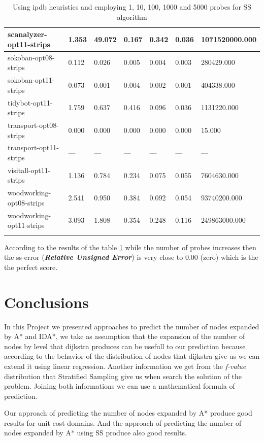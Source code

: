 \documentclass[11pt,a4paper,oneside]{report}
\begin{document}
\begin{longtable}{@{\extracolsep{\fill}} lllllll @{}}
scanalyzer-opt11-strips  & 1.353    & 49.072   & 0.167    & 0.342    & 0.036    & 1071520000.000 \\ \hline
sokoban-opt08-strips     & 0.112    & 0.026    & 0.005    & 0.004    & 0.003    & 280429.000     \\ \hline
sokoban-opt11-strips     & 0.073    & 0.001    & 0.004    & 0.002    & 0.001    & 404338.000     \\ \hline
tidybot-opt11-strips     & 1.759    & 0.637    & 0.416    & 0.096    & 0.036    & 1131220.000    \\ \hline
transport-opt08-strips   & 0.000    & 0.000    & 0.000    & 0.000    & 0.000    & 15.000         \\ \hline
transport-opt11-strips   & ---      & ---      & ---      & ---      & ---      & ---            \\ \hline
visitall-opt11-strips    & 1.136    & 0.784    & 0.234    & 0.075    & 0.055    & 7604630.000    \\ \hline
woodworking-opt08-strips & 2.541    & 0.950    & 0.384    & 0.092    & 0.054    & 93740200.000   \\ \hline
woodworking-opt11-strips & 3.093    & 1.808    & 0.354    & 0.248    & 0.116    & 249863000.000  \\ \hline
\caption{Using ipdb heuristics and employing 1, 10, 100, 1000 and 5000 probes for SS algorithm}
\label{table:comparison2}
\end{longtable}

According to the results of the table \ref{table:comparison2} while the number of probes increases then the ss-error (\textit{\textbf{Relative Unsigned Error}}) is very close to 0.00 (zero) which is the the perfect score.

\section{Conclusions}
In this Project we presented approaches to predict the number of nodes expanded by A* and  IDA*, we take as assumption that the expansion of the number of nodes by level that dijkstra produces can be usefull to our prediction because according to the behavior of the distribution of nodes that dijkstra give us we can extend it using linear regression. Another information we get from the \textit{f-value} distribution that Stratified Sampling give us when search the solution of the problem. Joining both informations we can use a mathematical formula of prediction.\newline

Our approach of predicting the number of nodes expanded by A* produce good results for unit cost domains. And the approach of predicting the number of nodes expanded by A* using SS produce also good results.
\newpage

%
\end{document}
